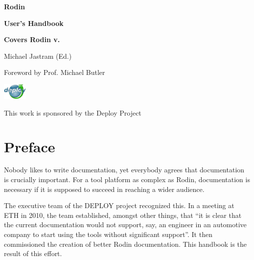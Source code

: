\documentclass[12pt]{book}
\begin{document}
\begin{titlepage}
\AddToShipoutPicture*{\BackgroundPic}
\vspace*{14.5cm}
{\fontsize{70}{85}\selectfont \bfseries Rodin}

\vspace*{0.2cm}
{\fontsize{24.5}{30}\selectfont \bfseries User's Handbook}

\vspace*{1cm}
{\fontsize{16}{19}\selectfont \textbf{\textsf{Covers Rodin v.\versionnr}}}

\vspace*{1cm}
{\fontsize{16}{19}\selectfont \textsf{Michael Jastram (Ed.)}}

\vspace*{0.2cm}
{\fontsize{16}{19}\selectfont \textsf{Foreword by Prof. Michael Butler}}

\vspace*{1cm}
\includegraphics[width=12mm]{img/deploy-logo.png}

\vspace*{-8.4mm}
\hspace*{12mm}
{ \fontsize{11}{15}\selectfont \textsf{This work is sponsored by the Deploy Project}}

\vspace*{-22mm}

\end{titlepage}
{}
\tableofcontents
\fi

\chapter*{Preface}
\label{preface}

Nobody likes to write documentation, yet everybody agrees that documentation is crucially important.  For a tool platform as complex as Rodin, documentation is necessary if it is supposed to succeed in reaching a wider audience.

The executive team of the DEPLOY project recognized this. In a meeting at ETH in 2010, the team established, amongst other things, that ``it is clear that the current documentation would not support, say, an engineer in an automotive company to start using the tools without significant support''.  It then commissioned the creation of better Rodin documentation.  This handbook is the result of this effort.
\end{document}
